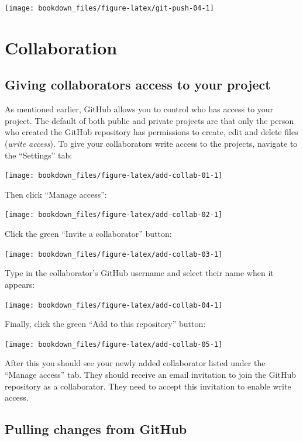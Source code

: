 \documentclass[
]{krantz}
\begin{document}
\texttt{[image: bookdown\_files/figure-latex/git-push-04-1]}

\hypertarget{collaboration}{%
\section{Collaboration}\label{collaboration}}

\hypertarget{giving-collaborators-access-to-your-project}{%
\subsection{Giving collaborators access to your project}\label{giving-collaborators-access-to-your-project}}

As mentioned earlier, GitHub allows you to control who has access to your
project. The default of both public and private projects are that only the
person who created the GitHub repository has permissions to create, edit and
delete files (\emph{write access}). To give your collaborators write access to the projects, navigate to the ``Settings'' tab:

\texttt{[image: bookdown\_files/figure-latex/add-collab-01-1]}

Then click ``Manage access'':

\texttt{[image: bookdown\_files/figure-latex/add-collab-02-1]}

Click the green ``Invite a collaborator'' button:

\texttt{[image: bookdown\_files/figure-latex/add-collab-03-1]}

Type in the collaborator's GitHub username and select their name when it
appears:

\texttt{[image: bookdown\_files/figure-latex/add-collab-04-1]}

Finally, click the green ``Add to this repository'' button:

\texttt{[image: bookdown\_files/figure-latex/add-collab-05-1]}

After this you should see your newly added collaborator listed under the
``Manage access'' tab. They should receive an email invitation to join the
GitHub repository as a collaborator. They need to accept this invitation
to enable write access.

\hypertarget{pulling-changes-from-github}{%
\subsection{Pulling changes from GitHub}\label{pulling-changes-from-github}}
\end{document}
